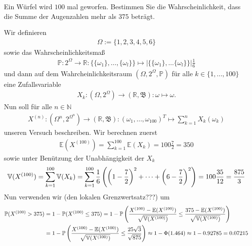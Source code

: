 \begin{exercise}

Ein Würfel wird $100$ mal geworfen. Bestimmen Sie die Wahrscheinlichkeit, dass die Summe der Augenzahlen mehr als $375$ beträgt.

\end{exercise}

\begin{solution}

Wir definieren
\begin{align*}
    \Omega := \{1,2,3,4,5,6\}
\end{align*}
sowie das Wahrscheinlichkeitsmaß
\begin{align*}
    \mathbb{P}:2^\Omega \to \mathbb{R}: \{\{\omega_1\},\dots,\{\omega_l\}\} \mapsto \vert \{\{\omega_1\},\dots\{\omega_l\}\} \vert \frac{1}{6}
\end{align*}
und dann auf dem Wahrcheinlichkeitsraum $(\Omega,2^\Omega,\mathbb{P})$ für alle $k \in \{1,\dots,100\}$ eine Zufallsvariable
\begin{align*}
    X_k:(\Omega,2^\Omega) \to (\mathbb{R},\mathfrak{B}): \omega \mapsto \omega.
\end{align*}
Nun soll für alle $n \in \mathbb{N}$
\begin{align*}
    X^{(n)}:(\Omega^n,2^{\Omega^n}) \to (\mathbb{R},\mathfrak{B}): (\omega_1,\dots,\omega_{100})^T \mapsto \sum_{k=1}^{n} X_k(\omega_k)
\end{align*}
unseren Versuch beschreiben. Wir berechnen zuerst
\begin{align*}
    \mathbb{E}(X^{(100)}) = \sum_{k=1}^{100} \mathbb{E}(X_k) = 100\frac{7}{2} = 350
\end{align*}
sowie unter Benützung der Unabhängigkeit der $X_k$
\begin{align*}
    \mathbb{V}(X^{(100)}) = \sum_{k=1}^{100} \mathbb{V}(X_k) = \sum_{k=1}^{100} \frac{1}{6} \left ( \left ( 1-\frac{7}{2} \right )^2+\cdots+\left ( 6-\frac{7}{2} \right )^2 \right ) = 100 \frac{35}{12} = \frac{875}{3}
\end{align*}
Nun verwenden wir (den lokalen Grenzwertsatz???) um
\begin{align*}
    \mathbb{P}(X^{(100)} > 375) &= 1 - \mathbb{P}(X^{(100)} \leq 375) = 1 - \mathbb{P}\left ( \frac{X^{(100)} - \mathbb{E}(X^{(100)})}{\sqrt{\mathbb{V}(X^{(100)})}} \leq \frac{375 - \mathbb{E}(X^{(100)})}{\sqrt{\mathbb{V}(X^{(100)})}} \right ) \\
    &= 1 - \mathbb{P}\left ( \frac{X^{(100)} - \mathbb{E}(X^{(100)})}{\sqrt{\mathbb{V}(X^{(100)})}} \leq \frac{25\sqrt{3}}{\sqrt{875}} \right ) \approx 1 - \Phi(1.464) \approx 1 - 0.92785 = 0.07215
\end{align*}
\end{solution}
